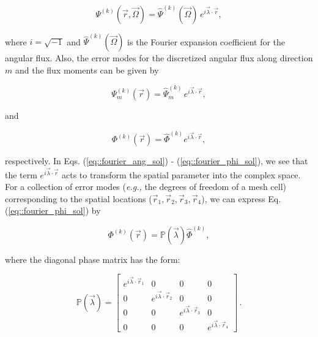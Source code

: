 \begin{equation}
\label{eq::fourier_ang_sol}
\Psi^{(k)}  (\vec{r}, \vec{\Omega})=  \hat{\Psi}^{(k)} (\vec{\Omega}) \, e^{i \vec{\lambda} \cdot \vec{r}},
\end{equation}

\noindent where $i=\sqrt{-1}$ and $\hat{\Psi}^{(k)} (\vec{\Omega})$ is the Fourier expansion coefficient for the angular flux.  Also, the error modes for the discretized angular flux along direction $m$ and the flux moments can be given by

\begin{equation}
\label{eq::fourier_ang_sol_disc}
\Psi_m^{(k)}  (\vec{r})=  \hat{\Psi}_m^{(k)}  \, e^{i \vec{\lambda} \cdot \vec{r}},
\end{equation}

and

\begin{equation}
\label{eq::fourier_phi_sol}
\Phi^{(k)} (\vec{r}) = \hat{\Phi}^{(k)} e^{i \vec{\lambda} \cdot \vec{r}},
\end{equation}

\noindent respectively. In Eqs. (\ref{eq::fourier_ang_sol}) - (\ref{eq::fourier_phi_sol}), we see that the term $e^{i \vec{\lambda} \cdot \vec{r}}$ acts to transform the spatial parameter into the complex space. For a collection of error modes ({\em e.g.,} the degrees of freedom of a mesh cell) corresponding to the spatial locations ($\vec{r}_1,\vec{r}_2,\vec{r}_3,\vec{r}_4$), we can express Eq. (\ref{eq::fourier_phi_sol}) by

\begin{equation}
\label{eq::fourier_phi_apply_phase}
\Phi^{(k)} (\vec{r}) = \mathbb{P} (\vec{\lambda})   \hat{\Phi}^{(k)} ,
\end{equation}

\noindent where the diagonal phase matrix has the form:

\begin{equation}
\label{eq::fourier_phase_matrix}
\mathbb{P} (\vec{\lambda}) = \left[
\begin{array}{cccc}
e^{i \vec{\lambda} \cdot \vec{r}_1} & 0 & 0 & 0\\
0 & e^{i \vec{\lambda} \cdot \vec{r}_2} & 0 & 0 \\
0 & 0 & e^{i \vec{\lambda} \cdot \vec{r}_3} & 0 \\
0 & 0 & 0 & e^{i \vec{\lambda} \cdot \vec{r}_4} 
\end{array}
\right] \, .
\end{equation}

